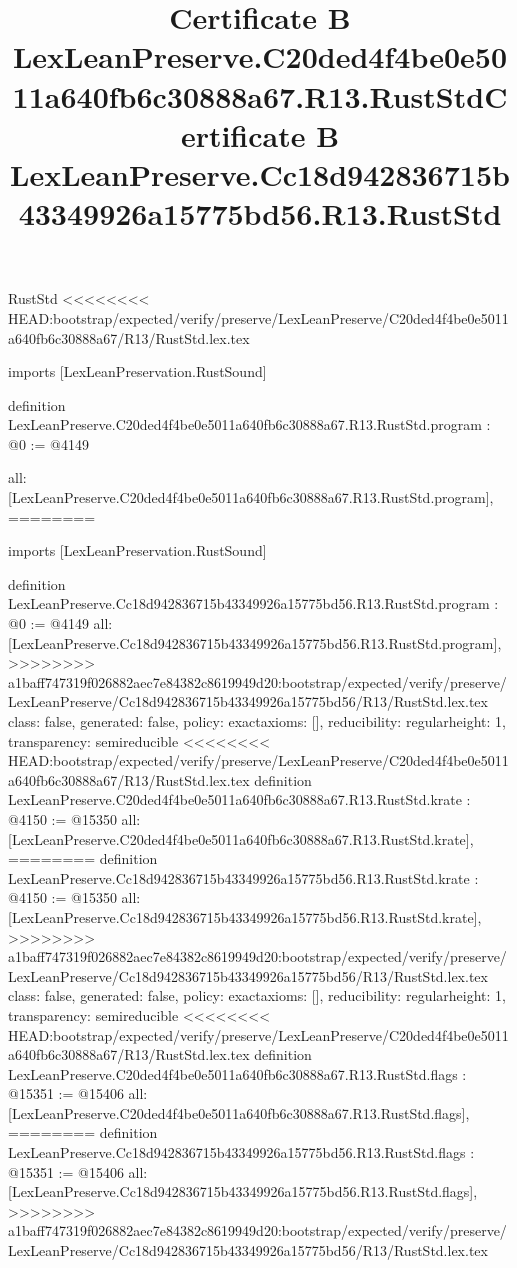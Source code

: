 \begin{lexlean}{RustStd}
<<<<<<<< HEAD:bootstrap/expected/verify/preserve/LexLeanPreserve/C20ded4f4be0e5011a640fb6c30888a67/R13/RustStd.lex.tex
\title{Certificate B LexLeanPreserve.C20ded4f4be0e5011a640fb6c30888a67.R13.RustStd}
\begin{coremodule}
imports [LexLeanPreservation.RustSound]

definition LexLeanPreserve.C20ded4f4be0e5011a640fb6c30888a67.R13.RustStd.program : @0 := @4149 {
  all: [LexLeanPreserve.C20ded4f4be0e5011a640fb6c30888a67.R13.RustStd.program],
========
\title{Certificate B LexLeanPreserve.Cc18d942836715b43349926a15775bd56.R13.RustStd}
\begin{coremodule}
imports [LexLeanPreservation.RustSound]

definition LexLeanPreserve.Cc18d942836715b43349926a15775bd56.R13.RustStd.program : @0 := @4149 {
  all: [LexLeanPreserve.Cc18d942836715b43349926a15775bd56.R13.RustStd.program],
>>>>>>>> a1baff747319f026882aec7e84382c8619949d20:bootstrap/expected/verify/preserve/LexLeanPreserve/Cc18d942836715b43349926a15775bd56/R13/RustStd.lex.tex
  class: false,
  generated: false,
  policy: exact{axioms: []},
  reducibility: regular{height: 1},
  transparency: semireducible
}
<<<<<<<< HEAD:bootstrap/expected/verify/preserve/LexLeanPreserve/C20ded4f4be0e5011a640fb6c30888a67/R13/RustStd.lex.tex
definition LexLeanPreserve.C20ded4f4be0e5011a640fb6c30888a67.R13.RustStd.krate : @4150 := @15350 {
  all: [LexLeanPreserve.C20ded4f4be0e5011a640fb6c30888a67.R13.RustStd.krate],
========
definition LexLeanPreserve.Cc18d942836715b43349926a15775bd56.R13.RustStd.krate : @4150 := @15350 {
  all: [LexLeanPreserve.Cc18d942836715b43349926a15775bd56.R13.RustStd.krate],
>>>>>>>> a1baff747319f026882aec7e84382c8619949d20:bootstrap/expected/verify/preserve/LexLeanPreserve/Cc18d942836715b43349926a15775bd56/R13/RustStd.lex.tex
  class: false,
  generated: false,
  policy: exact{axioms: []},
  reducibility: regular{height: 1},
  transparency: semireducible
}
<<<<<<<< HEAD:bootstrap/expected/verify/preserve/LexLeanPreserve/C20ded4f4be0e5011a640fb6c30888a67/R13/RustStd.lex.tex
definition LexLeanPreserve.C20ded4f4be0e5011a640fb6c30888a67.R13.RustStd.flags : @15351 := @15406 {
  all: [LexLeanPreserve.C20ded4f4be0e5011a640fb6c30888a67.R13.RustStd.flags],
========
definition LexLeanPreserve.Cc18d942836715b43349926a15775bd56.R13.RustStd.flags : @15351 := @15406 {
  all: [LexLeanPreserve.Cc18d942836715b43349926a15775bd56.R13.RustStd.flags],
>>>>>>>> a1baff747319f026882aec7e84382c8619949d20:bootstrap/expected/verify/preserve/LexLeanPreserve/Cc18d942836715b43349926a15775bd56/R13/RustStd.lex.tex
}}}
\end{coremodule}}
\end{coremodule}
\end{lexlean}
